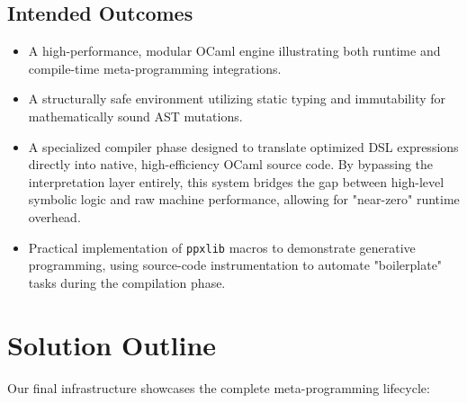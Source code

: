 \documentclass[12pt]{article}
\begin{document}
\subsection*{Intended Outcomes}
\begin{itemize}
    \item A high-performance, modular OCaml engine illustrating both runtime and compile-time meta-programming integrations.
    \item A structurally safe environment utilizing static typing and immutability for mathematically sound AST mutations.
    \item 
A specialized compiler phase designed to translate optimized DSL expressions directly into native, high-efficiency OCaml source code. By bypassing the interpretation layer entirely, this system bridges the gap between high-level symbolic logic and raw machine performance, allowing for "near-zero" runtime overhead.
    \item Practical implementation of \texttt{ppxlib} macros to demonstrate generative programming, using source-code instrumentation to automate "boilerplate" tasks during the compilation phase.
\end{itemize}

\section{Solution Outline}

Our final infrastructure showcases the complete meta-programming lifecycle:
\end{document}

